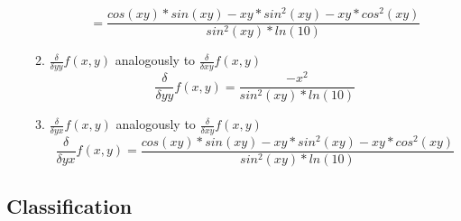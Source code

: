\documentclass[12pt]{article}
\begin{document}
\begin{enumerate}
\begin{enumerate}
			$$ = \frac{cos(xy)*sin(xy)- xy*sin^2(xy) - xy *cos^2(xy)}{sin^2(xy)*ln(10)} $$
			\item
			$  \frac{\delta}{\delta yy} f(x,y)$ analogously to $  \frac{\delta}{\delta xy} f(x,y) $ \\
			$$  \frac{\delta}{\delta yy} f(x,y)= \frac{-x^2}{sin^2(xy)*ln(10)}$$
			\item
			$  \frac{\delta}{\delta yx} f(x,y)$ analogously to $ \frac{\delta}{\delta xy} f(x,y) $
			$$  \frac{\delta}{\delta yx} f(x,y) = \frac{cos(xy)*sin(xy)- xy*sin^2(xy) - xy *cos^2(xy)}{sin^2(xy)*ln(10)} $$
		\end{enumerate}
		
	\end{enumerate}

\subsection{Classification}
\end{document}
